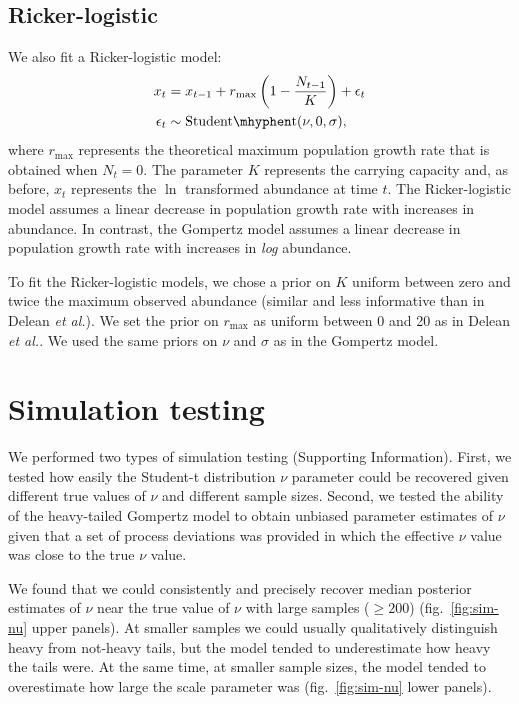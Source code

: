 \documentclass[12pt]{article}
\begin{document}
\subsection{Ricker-logistic} We also fit a Ricker-logistic model:
\begin{align}
x_t &= x_{t-1} + r_{\mathrm{max}}\left(1 - \frac{N_{t-1}}{K}\right) + \epsilon_t\\
\epsilon_t &\sim \mathrm{Student\mhyphen t}(\nu, 0, \sigma),
\end{align}
where \(r_\mathrm{max}\) represents the theoretical maximum population growth rate that is obtained when \(N_t = 0\). The parameter \(K\) represents the carrying capacity and, as before, \(x_t\) represents the \(\ln\) transformed abundance at time \(t\). The Ricker-logistic model assumes a linear decrease in population growth rate with increases in abundance. In contrast, the Gompertz model assumes a linear decrease in population growth rate with increases in \textit{log} abundance.

To fit the Ricker-logistic models, we chose a prior on \(K\) uniform between zero and twice the maximum observed abundance (similar and less informative than in Delean \emph{et al.}\cite{delean2013}). We set the prior on \(r_\mathrm{max}\) as uniform between 0 and 20 as in Delean \emph{et al.}\cite{delean2013}. We used the same priors on \(\nu\) and \(\sigma\) as in the Gompertz model.

\section{Simulation testing} We performed two types of simulation testing (Supporting Information). First, we tested how easily the Student-t distribution \(\nu\) parameter could be recovered given different true values of \(\nu\) and different sample sizes. Second, we tested the ability of the heavy-tailed Gompertz model to obtain unbiased parameter estimates of \(\nu\) given that a set of process deviations was provided in which the effective \(\nu\) value was close to the true \(\nu\) value.

We found that we could consistently and precisely recover median posterior estimates of \(\nu\) near the true value of \(\nu\) with large samples (\(\ge 200\)) (fig.~\ref{fig:sim-nu} upper panels). At smaller samples we could usually qualitatively distinguish heavy from not-heavy tails, but the model tended to underestimate how heavy the tails were. At the same time, at smaller sample sizes, the model tended to overestimate how large the scale parameter was (fig.~\ref{fig:sim-nu} lower panels).
\end{document}

